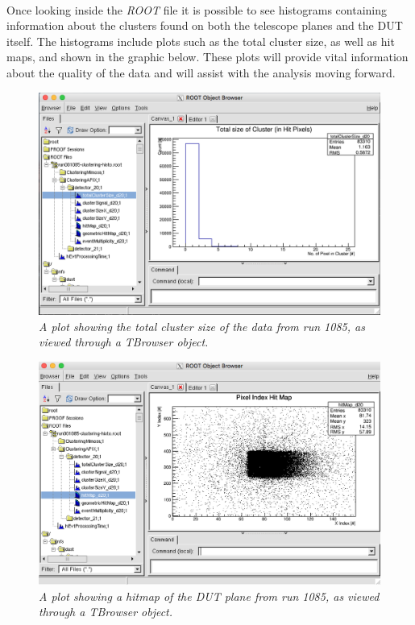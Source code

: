 \documentclass[11pt]{article}
\begin{document}
\paragraph{}
Once looking inside the \textit{ROOT} file it is possible to see histograms containing information about the clusters found on both the telescope planes and the DUT itself. The histograms include plots such as the total cluster size, as well as hit maps, and shown in the graphic below. These plots will provide vital information about the quality of the data and will assist with the analysis moving forward.
\begin{figure}[!ht]
	\centering
	\includegraphics[scale=0.4]{clustering_totalclustersize.png}
	\caption{\textit{A plot showing the total cluster size of the data from run 1085, as viewed through a TBrowser object.}}
\end{figure}
\begin{figure}[!ht]
	\centering
	\includegraphics[scale=0.4]{clustering_hitmap.png}
	\caption{\textit{A plot showing a hitmap of the DUT plane from run 1085, as viewed through a TBrowser object.}}
\end{figure}
\end{document}
